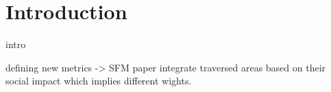\section{Introduction}

intro

defining new metrics -> SFM paper 
integrate traversed areas based on their social impact which implies different wights.
